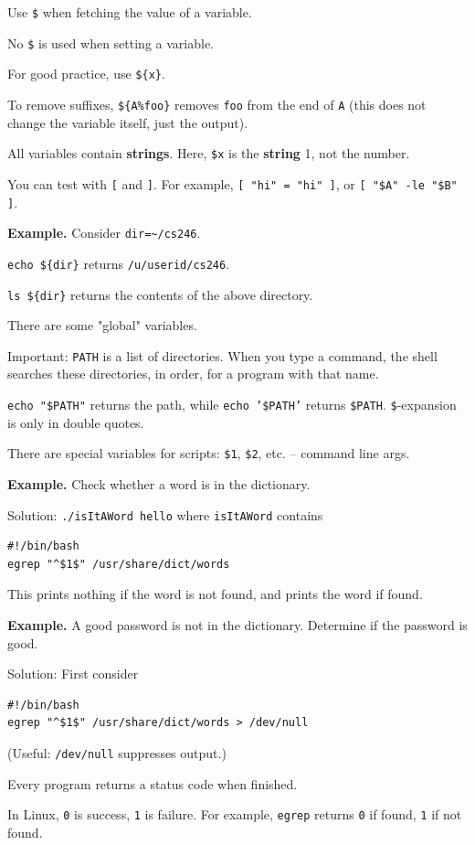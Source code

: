 \documentclass[11pt]{article}
\theoremstyle{definition}
\begin{document}
Use {\tt \$} when fetching the value of a variable.

No {\tt \$} is used when setting a variable.

For good practice, use {\tt \$\{x\}}.

To remove suffixes, {\tt \$\{A\%foo\}} removes {\tt foo} from the end of {\tt A} (this does not change the variable itself, just the output).

All variables contain {\bf strings}. Here, {\tt \$x} is the {\bf string} 1, not the number.

You can test with {\tt [} and {\tt ]}. For example, {\tt [ "hi" = "hi" ]}, or {\tt [ "\$A" -le "\$B" ]}.

{\bf Example.} Consider {\tt dir=\~\null/cs246}. 

{\tt echo \$\{dir\}} returns {\tt /u/userid/cs246}.

{\tt ls \$\{dir\}} returns the contents of the above directory.

There are some "global" variables.

Important: {\tt PATH} is a list of directories. When you type a command, the shell searches these directories, in order, for a program with that name. 

{\tt echo "\$PATH"} returns the path, while {\tt echo '\$PATH'} returns {\tt \$PATH}. {\tt \$}-expansion is only in double quotes.

There are special variables for scripts: {\tt \$1}, {\tt \$2}, etc. -- command line args. 

{\bf Example.} Check whether a word is in the dictionary.

Solution: {\tt ./isItAWord hello} where {\tt isItAWord} contains 
\begin{verbatim}
#!/bin/bash
egrep "^$1$" /usr/share/dict/words
\end{verbatim}
This prints nothing if the word is not found, and prints the word if found.

{\bf Example.} A good password is not in the dictionary. Determine if the password is good.

Solution: First consider 
\begin{verbatim}
#!/bin/bash
egrep "^$1$" /usr/share/dict/words > /dev/null
\end{verbatim}

(Useful: {\tt /dev/null} suppresses output.)

Every program returns a status code when finished.

In Linux, {\tt 0} is success, {\tt 1} is failure. For example, {\tt egrep} returns {\tt 0} if found, {\tt 1} if not found.
\end{document}
